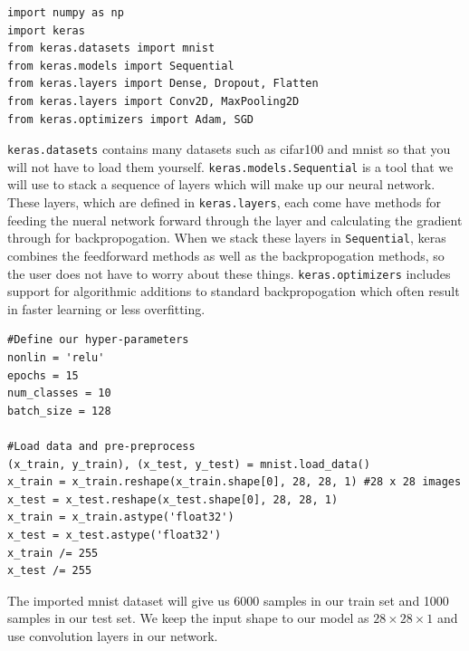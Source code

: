 \documentclass[11pt]{article}
\begin{document}
\begin{lstlisting}
import numpy as np
import keras
from keras.datasets import mnist
from keras.models import Sequential
from keras.layers import Dense, Dropout, Flatten
from keras.layers import Conv2D, MaxPooling2D
from keras.optimizers import Adam, SGD
\end{lstlisting}

\texttt{keras.datasets} contains many datasets such as cifar100 and mnist so that you will not have to load them yourself. \texttt{keras.models.Sequential} is a tool that we will use to stack a sequence of layers which will make up our neural network. These layers, which are defined in \texttt{keras.layers}, each come have methods for feeding the nueral network forward through the layer and calculating the gradient through for backpropogation. When we stack these layers in \texttt{Sequential{}}, keras combines the feedforward methods as well as the backpropogation methods, so the user does not have to worry about these things. \texttt{keras.optimizers} includes support for algorithmic additions to standard backpropogation which often result in faster learning or less overfitting.

\begin{lstlisting}
#Define our hyper-parameters
nonlin = 'relu'
epochs = 15
num_classes = 10
batch_size = 128

#Load data and pre-preprocess
(x_train, y_train), (x_test, y_test) = mnist.load_data()
x_train = x_train.reshape(x_train.shape[0], 28, 28, 1) #28 x 28 images
x_test = x_test.reshape(x_test.shape[0], 28, 28, 1) 
x_train = x_train.astype('float32')
x_test = x_test.astype('float32')
x_train /= 255
x_test /= 255
\end{lstlisting}

 The imported mnist dataset will give us 6000 samples in our train set and 1000 samples in our test set. We keep the input shape to our model as $28 \times 28 \times 1$ and use convolution layers in our network.
 
\end{document}
